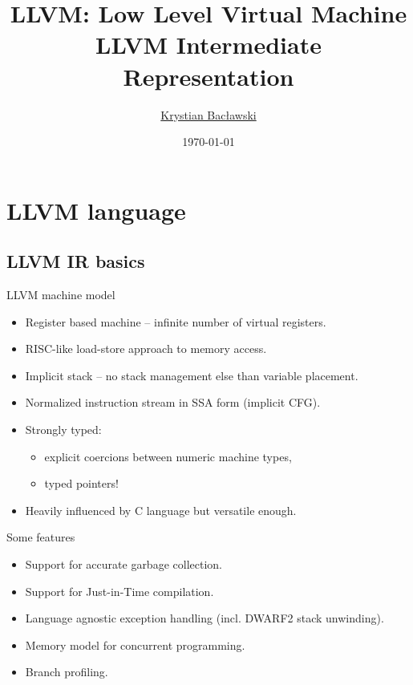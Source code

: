 \documentclass[8pt]{beamer}
\title[LLVM]{LLVM: Low Level Virtual Machine\\LLVM Intermediate Representation}
\author[Krystian Bacławski]{\href{mailto:cahirwpz@cs.uni.wroc.pl}{Krystian Bacławski}}
\institute{Computer Science Department\\University of Wrocław}
\date{\today}
\begin{document}
\begin{frame}
\titlepage
\end{frame}

\section[Language]{LLVM language}

\subsection*{LLVM IR basics}

\begin{frame}[fragile]{LLVM machine model}
  \begin{block}{}
    \begin{itemize}
      \item Register based machine -- infinite number of virtual registers.
      \item RISC-like load-store approach to memory access.
      \item Implicit stack -- no stack management else than variable placement.
      \item Normalized instruction stream in SSA form (implicit CFG).
      \item Strongly typed:
        \begin{itemize}
          \item explicit coercions between numeric machine types,
          \item typed pointers!
        \end{itemize}
      \item Heavily influenced by C language but versatile enough.
    \end{itemize}
  \end{block}

  \begin{block}{Some features}
    \begin{itemize}
      \item Support for accurate garbage collection.
      \item Support for Just-in-Time compilation.
      \item Language agnostic exception handling (incl. DWARF2 stack unwinding).
      \item Memory model for concurrent programming.
      \item Branch profiling.
    \end{itemize}
  \end{block}
\end{frame}
\end{document}
